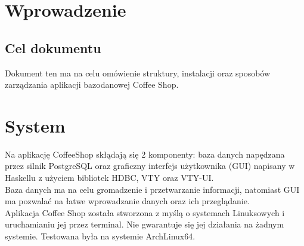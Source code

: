


\tableofcontents
\clearpage
\section{Wprowadzenie}
\subsection{Cel dokumentu}
Dokument ten ma na celu omówienie struktury, instalacji oraz sposobów zarządzania aplikacji bazodanowej Coffee Shop.
\section{System}
Na aplikację CoffeeShop skłądają się 2 komponenty: baza danych napędzana przez silnik PostgreSQL oraz graficzny interfejs użytkownika (GUI) napisany w Haskellu z użyciem bibliotek HDBC, VTY oraz VTY-UI. \\
Baza danych ma na celu gromadzenie i przetwarzanie informacji, natomiast  GUI ma pozwalać na łatwe wprowadzanie danych oraz ich przeglądanie.\\
Aplikacja Coffee Shop została stworzona z myślą o systemach Linuksowych i uruchamianiu jej przez terminal. Nie gwarantuje się jej działania na żadnym systemie. Testowana była na systemie ArchLinux64.

